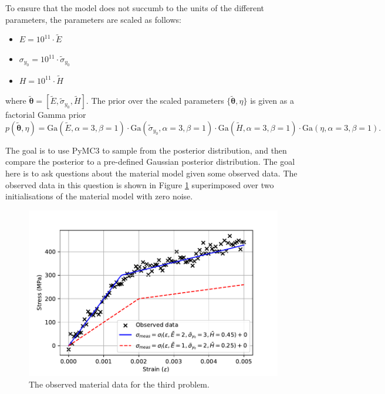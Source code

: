 \documentclass{article}
\begin{document}
	To ensure that the model does not succumb to the units of the different parameters, the parameters are scaled as follows:
	\begin{itemize}
		\item $E = 10^{11} \cdot \tilde{E}$
		\item $\sigma_{y_0} = 10^{11} \cdot \tilde{\sigma}_{y_0}$
		\item $H = 10^{11} \cdot \tilde{H}$
	\end{itemize}
	where $\tilde{\boldsymbol\theta} = \left[ \tilde{E}, \tilde{\sigma}_{y_0}, \tilde{H} \right]$. The prior over the scaled parameters $\{\tilde{\boldsymbol\theta}, \eta \}$ is given as a factorial Gamma prior
	\begin{equation}
		p(\tilde{\boldsymbol\theta}, \eta) = \text{Ga} \left( \tilde{E}, \alpha = 3, \beta = 1 \right) \cdot \text{Ga} \left( \tilde{\sigma}_{y_0}, \alpha = 3, \beta = 1 \right) \cdot \text{Ga} \left( \tilde{H}, \alpha = 3, \beta = 1 \right) \cdot \text{Ga} \left( \eta, \alpha = 3, \beta = 1 \right).
	\end{equation}

	The goal is to use PyMC3 to sample from the posterior distribution, and then compare the posterior to a pre-defined Gaussian posterior distribution. The goal here is to ask questions about the material model given some observed data. The observed data in this question is shown in Figure \ref{fig:Q3_observed_data} superimposed over two initialisations of the material model with zero noise.
	\begin{figure}[htb!]
		\centering
		\includegraphics[scale=0.5]{Q3a.pdf}
		\caption{The observed material data for the third problem.}
		\label{fig:Q3_observed_data}
	\end{figure}
\end{document}
